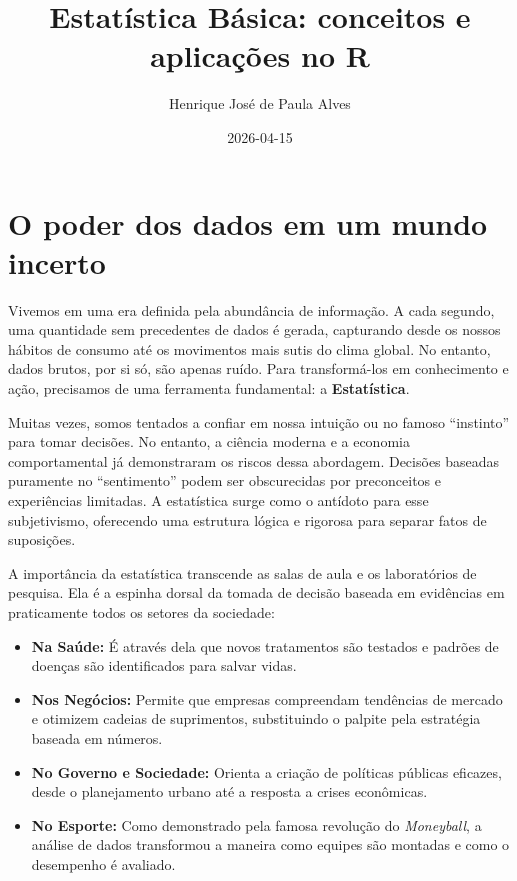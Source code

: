 \documentclass[
  letterpaper,
]{book}
\title{Estatística Básica: conceitos e aplicações no R}
\author{Henrique José de Paula Alves}
\date{2026-04-15}
\renewcommand*\contentsname{Table of contents}
\newcommand\contentsname{Table of contents}
\begin{document}
\frontmatter
\maketitle

\renewcommand*\contentsname{Table of contents}
{
\setcounter{tocdepth}{2}
\tableofcontents
}

\mainmatter
{}

\chapter*{O poder dos dados em um mundo
incerto}\label{o-poder-dos-dados-em-um-mundo-incerto}


Vivemos em uma era definida pela abundância de informação. A cada
segundo, uma quantidade sem precedentes de dados é gerada, capturando
desde os nossos hábitos de consumo até os movimentos mais sutis do clima
global. No entanto, dados brutos, por si só, são apenas ruído. Para
transformá-los em conhecimento e ação, precisamos de uma ferramenta
fundamental: a \textbf{Estatística}.

Muitas vezes, somos tentados a confiar em nossa intuição ou no famoso
``instinto'' para tomar decisões. No entanto, a ciência moderna e a
economia comportamental já demonstraram os riscos dessa abordagem.
Decisões baseadas puramente no ``sentimento'' podem ser obscurecidas por
preconceitos e experiências limitadas. A estatística surge como o
antídoto para esse subjetivismo, oferecendo uma estrutura lógica e
rigorosa para separar fatos de suposições.

A importância da estatística transcende as salas de aula e os
laboratórios de pesquisa. Ela é a espinha dorsal da tomada de decisão
baseada em evidências em praticamente todos os setores da sociedade:

\begin{itemize}
\item
  \textbf{Na Saúde:} É através dela que novos tratamentos são testados e
  padrões de doenças são identificados para salvar vidas.
\item
  \textbf{Nos Negócios:} Permite que empresas compreendam tendências de
  mercado e otimizem cadeias de suprimentos, substituindo o palpite pela
  estratégia baseada em números.
\item
  \textbf{No Governo e Sociedade:} Orienta a criação de políticas
  públicas eficazes, desde o planejamento urbano até a resposta a crises
  econômicas.
\item
  \textbf{No Esporte:} Como demonstrado pela famosa revolução do
  \emph{Moneyball}, a análise de dados transformou a maneira como
  equipes são montadas e como o desempenho é avaliado.
\end{itemize}
\end{document}
